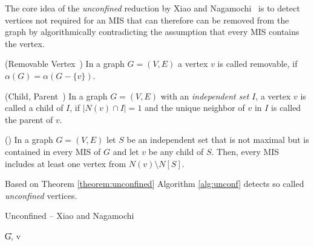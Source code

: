 \documentclass[a4paper,UKenglish,cleveref, autoref, thm-restate]{lipics-v2021}
\begin{document}
The core idea of the \emph{unconfined} reduction by Xiao and
Nagamochi~\cite{XiaoUnconfined} is to detect vertices not required for an MIS
that can therefore can be removed from the graph by algorithmically
contradicting the assumption that every MIS contains the vertex.

\begin{definition} (Removable Vertex~\cite{XiaoUnconfined})
	In a graph $G=(V,E)$ a vertex $v$ is called removable, if 
	$\alpha(G) = \alpha(G-\{v\})$.
\end{definition}

\begin{definition} (Child, Parent~\cite{XiaoUnconfined}) In a graph $G=(V,E)$ with an \textit{independent set} $I$, a vertex $v$ is called a child of $I$, if $|N(v)\cap I| = 1$ and the unique neighbor of $v$ in $I$ is called the parent of $v$.
\end{definition}

\begin{theorem} (\cite{XiaoUnconfined})\label{theorem:unconfined}
	In a graph $G=(V,E)$ let $S$ be an independent set that is not maximal but is contained in every MIS of $G$ and let $v$ be any child of $S$. Then, every MIS includes at least one vertex from $N(v)\setminus N[S]$.
\end{theorem}

Based on Theorem \ref{theorem:unconfined} Algorithm \ref{alg:unconf} detects so called \textit{unconfined} vertices.

\begin{algorithm}[t]
	\caption{Unconfined -- Xiao and Nagamochi
      \cite{XiaoUnconfined}}\label{alg:unconf}
	\DontPrintSemicolon
	
	\U{G, v}	
	
	
\end{algorithm}
\end{document}
